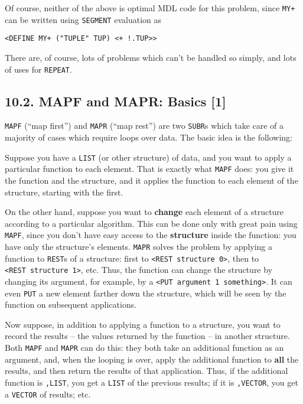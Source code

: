 \documentclass[a4paper,]{article}
\begin{document}
Of course, neither of the above is optimal MDL code for this problem, since \texttt{MY+} can be written using
\texttt{SEGMENT} evaluation as

\begin{verbatim}
<DEFINE MY+ ("TUPLE" TUP) <+ !.TUP>>
\end{verbatim}

There are, of course, lots of problems which can't be handled so simply, and lots of uses for \texttt{REPEAT}.

\subsection{10.2. MAPF and MAPR: Basics {[}1{]}}\label{mapf-and-mapr-basics-1}

\texttt{MAPF}  (``map first'') and \texttt{MAPR}  (``map rest'')
are two \texttt{SUBR}s which take care of a majority of cases which require loops over data. The basic idea is the
following:

Suppose you have a \texttt{LIST} (or other structure) of data, and you want to apply a particular function to each element.
That is exactly what \texttt{MAPF} does: you give it the function and the structure, and it applies the function to each
element of the structure, starting with the first.

On the other hand, suppose you want to \textbf{change} each element of a structure according to a particular algorithm.
This can be done only with great pain using \texttt{MAPF}, since you don't have easy access to the \textbf{structure}
inside the function: you have only the structure's elements. \texttt{MAPR} solves the problem by applying a function to
\texttt{REST}s of a structure: first to \texttt{\textless{}REST\ structure\ 0\textgreater{}}, then to
\texttt{\textless{}REST\ structure\ 1\textgreater{}}, etc. Thus, the function can change the structure by changing its
argument, for example, by a \texttt{\textless{}PUT\ argument\ 1\ something\textgreater{}}. It can even \texttt{PUT} a new
element farther down the structure, which will be seen by the function on subsequent applications.

Now suppose, in addition to applying a function to a structure, you want to record the results -- the values returned by
the function -- in another structure. Both \texttt{MAPF} and \texttt{MAPR} can do this: they both take an additional
function as an argument, and, when the looping is over, apply the additional function to \textbf{all} the results, and then
return the results of that application. Thus, if the additional function is \texttt{,LIST}, you get a \texttt{LIST} of the
previous results; if it is \texttt{,VECTOR}, you get a \texttt{VECTOR} of results; etc.
\end{document}
